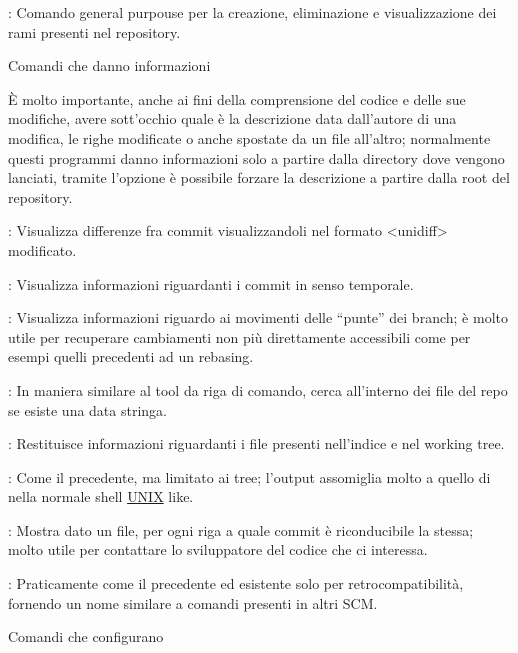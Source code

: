 \elemento{}: Comando general purpouse per la creazione, eliminazione
e visualizzazione dei rami presenti nel repository.

\sezione Comandi che danno informazioni

\`E molto importante, anche ai fini della comprensione del codice e delle sue
modifiche, avere sott'occhio quale \`e la descrizione data dall'autore di una
modifica, le righe modificate o anche spostate da un file all'altro; normalmente
questi programmi danno informazioni solo a partire dalla directory dove vengono
lanciati, tramite l'opzione  \`e possibile forzare la
descrizione a partire dalla root del repository.

\elemento{}: Visualizza differenze fra commit visualizzandoli nel
formato \evidenzia<unidiff>
modificato.

\elemento{}: Visualizza informazioni riguardanti i commit in senso
temporale.

\elemento{}: Visualizza informazioni riguardo ai movimenti delle
``punte'' dei branch; \`e molto utile per recuperare cambiamenti non pi\`u
direttamente accessibili come per esempi quelli precedenti ad un rebasing.

\elemento{}: In maniera similare al tool da riga di comando, cerca
all'interno dei file del repo se esiste una data stringa.

\elemento{}: Restituisce informazioni riguardanti i file presenti
nell'indice e nel working tree.

\elemento{}: Come il precedente, ma limitato ai tree; l'output
assomiglia molto a quello di  nella normale shell \url{UNIX} like.

\elemento{}: Mostra dato un file, per ogni riga
a quale commit \`e riconducibile la stessa; molto utile per contattare lo
sviluppatore del codice che ci interessa.

\elemento{}: Praticamente come il precedente ed esistente solo per
retrocompatibilit\`a, fornendo un nome similare a comandi presenti in altri SCM.

\sezione Comandi che configurano

